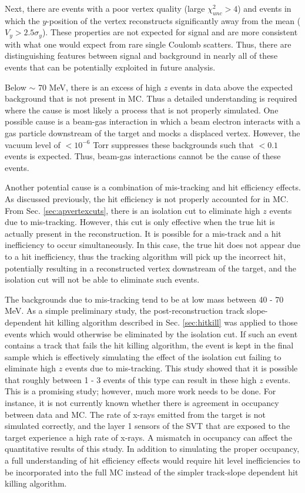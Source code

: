Next, there are events with a poor vertex quality (large $\chi^2_{unc}>4$) and events in which the $y$-position of the vertex reconstructs significantly away from the mean ($V_y>2.5\sigma_y$). These properties are not expected for signal and are more consistent with what one would expect from rare single Coulomb scatters. Thus, there are distinguishing features between signal and background in nearly all of these events that can be potentially exploited in future analysis.

Below $\sim$ 70 MeV, there is an excess of high $z$ events in data above the expected background that is not present in MC. Thus a detailed understanding is required where the cause is most likely a process that is not properly simulated. One possible cause is a beam-gas interaction in which a beam electron interacts with a gas particle downstream of the target and mocks a displaced vertex. However, the vacuum level of $<10^{-6}$ Torr suppresses these backgrounds such that $<0.1$ events is expected. Thus, beam-gas interactions cannot be the cause of these events.

Another potential cause is a combination of mis-tracking and hit efficiency effects. As discussed previously, the hit efficiency is not properly accounted for in MC. From Sec. \ref{sec:apvertexcuts}, there is an isolation cut to eliminate high $z$ events due to mis-tracking. However, this cut is only effective when the true hit is actually present in the reconstruction. It is possible for a mis-track and a hit inefficiency to occur simultaneously. In this case, the true hit does not appear due to a hit inefficiency, thus the tracking algorithm will pick up the incorrect hit, potentially resulting in a reconstructed vertex downstream of the target, and the isolation cut will not be able to eliminate such events.

The backgrounds due to mis-tracking tend to be at low mass between 40 - 70 MeV. As a simple preliminary study, the post-reconstruction track slope-dependent hit killing algorithm described in Sec. \ref{sec:hitkill} was applied to those events which would otherwise be eliminated by the isolation cut. If such an event contains a track that fails the hit killing algorithm, the event is kept in the final sample which is effectively simulating the effect of the isolation cut failing to eliminate high $z$ events due to mis-tracking. This study showed that it is possible that roughly between 1 - 3 events of this type can result in these high $z$ events. This is a promising study; however, much more work needs to be done. For instance, it is not currently known whether there is agreement in occupancy between data and MC. The rate of x-rays emitted from the target is not simulated correctly, and the layer 1 sensors of the SVT that are exposed to the target experience a high rate of x-rays. A mismatch in occupancy can affect the quantitative results of this study. In addition to simulating the proper occupancy, a full understanding of hit efficiency effects would require hit level inefficiencies to be incorporated into the full MC instead of the simpler track-slope dependent hit killing algorithm.

